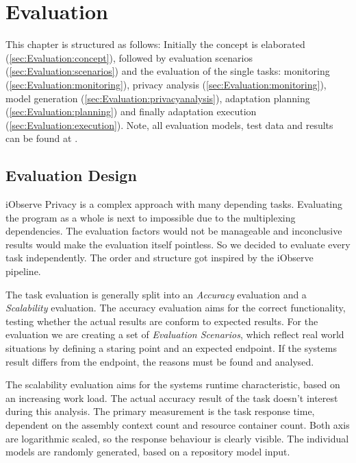 
\chapter{Evaluation}
\label{ch:Evaluation}

This chapter is structured as follows: Initially the concept is elaborated (\autoref{sec:Evaluation:concept}), followed by evaluation scenarios (\autoref{sec:Evaluation:scenarios}) and the evaluation of the single tasks: monitoring (\autoref{sec:Evaluation:monitoring}), privacy analysis (\autoref{sec:Evaluation:monitoring}), model generation (\autoref{sec:Evaluation:privacyanalysis}), adaptation planning (\autoref{sec:Evaluation:planning}) and finally adaptation execution (\autoref{sec:Evaluation:execution}). Note, all evaluation models, test data and results can be found at \cite{privacy.PW}.

\section{Evaluation Design}
\label{sec:Evaluation:concept}

iObserve Privacy is a complex approach with many depending tasks. Evaluating the program as a whole is next to impossible due to the multiplexing dependencies. The evaluation factors would not be manageable and inconclusive results would make the evaluation itself pointless. So we decided to evaluate every task independently. The order and structure got inspired by the iObserve pipeline.

The task evaluation is generally split into an \textit{Accuracy} evaluation and a \textit{Scalability} evaluation. The accuracy evaluation aims for the correct functionality, testing whether the actual results are conform to expected results. For the evaluation we are creating a set of \textit{Evaluation Scenarios}, which reflect real world situations by defining a staring point and an expected endpoint. If the systems result differs from the endpoint, the reasons must be found and analysed.

The scalability evaluation aims for the systems runtime characteristic, based on an increasing work load. The actual accuracy result of the task doesn't interest during this analysis. The primary measurement is the task response time, dependent on the assembly context count and resource container count. Both axis are logarithmic scaled, so the response behaviour is clearly visible. The individual models are randomly generated, based on a repository model input.

